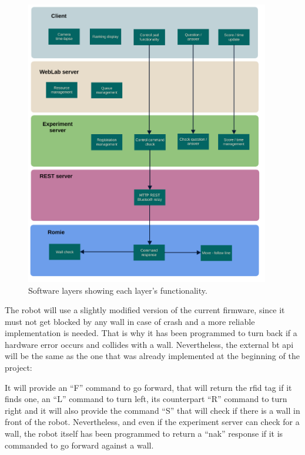 \clearpage
\begin{figure}
	\centering
	\includegraphics[width=0.95\textwidth]{fig/layers}
	\caption{Software layers showing each layer's functionality.}
	\label{fig:layers}
\end{figure}
\clearpage

The robot will use a slightly modified version of the current firmware, since it must not get
blocked by any wall in case of crash and a more reliable implementation is needed. That is why it
has been programmed to turn back if a hardware error occurs and collides with a wall. Nevertheless,
the external \acrlong{bt} \acrshort{api} will be the same as the one that was already implemented at
the beginning of the project:

It will provide an ``F'' command to go forward, that will return the \acrshort{rfid} tag if it finds
one, an ``L'' command to turn left, its counterpart ``R'' command to turn right and it will also
provide the command ``S'' that will check if there is a wall in front of the robot. Nevertheless,
and even if the experiment server can check for a wall, the robot itself has been programmed to
return a ``\acrshort{nak}'' response if it is commanded to go forward against a wall.


